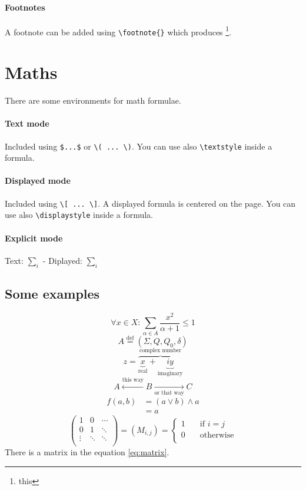 \paragraph{Footnotes}
A footnote can be added using \lstinline!\footnote{}! which produces
\footnote{this}.

\section{Maths}

There are some environments for math formulae.

\paragraph{Text mode}
Included using \lstinline!$...$! or \lstinline$\( ... \)$.
You can use also \lstinline$\textstyle$ inside a formula.

\paragraph{Displayed mode}
Included using \lstinline$\[ ... \]$.
A displayed formula is centered on the page.
You can use also \lstinline$\displaystyle$ inside a formula.

\paragraph{Explicit mode}
Text: $\textstyle \sum_i$ - Diplayed: $\displaystyle \sum_i$

\subsection*{Some examples}
\[ \forall x \in X: \sum_{\alpha \in A} \frac{x^2}{\alpha + 1} \leq 1 \]
\[ A \overset{\textrm{def}}{=} (\Sigma, Q, Q_0, \delta) \]
\[ z = \overbrace{
	\underbrace{x}_\text{real} +
	\underbrace{iy}_\text{imaginary}
	}^\text{complex number}
\]
\[ A \xleftarrow{\text{this way}} B
	\xrightarrow[\text{or that way}]{} C \]
\begin{align*}
f(a, b)
	&= (a \vee b) \wedge a \\
	&= a
\end{align*}
\begin{equation}
\label{eq:matrix}
\begin{pmatrix}
1 & 0 & \cdots \\
0 & 1 & \ddots \\
\vdots & \ddots & \ddots \\
\end{pmatrix}
= (M_{i,j}) = \left\lbrace\begin{array}{cl}
1 & \quad \text{if $i = j$} \\
0 & \quad \text{otherwise} \\
\end{array}\right.
\end{equation}
There is a matrix in the equation \eqref{eq:matrix}.


